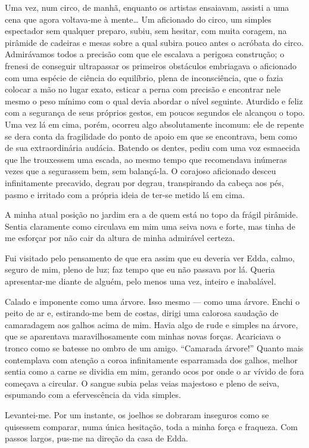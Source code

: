 Uma vez, num circo, de manhã, enquanto os artistas ensaiavam, assisti a uma cena que agora voltava-me à mente\ldots{} Um aficionado do circo, um simples espectador sem qualquer preparo, subiu, sem hesitar, com muita coragem, na pirâmide de cadeiras e mesas sobre a qual subira pouco antes o acróbata do circo. Admirávamos todos a precisão com que ele escalava a perigosa construção; o frenesi de conseguir ultrapassar os primeiros obstáculos embriagava o aficionado com uma espécie de ciência do equilíbrio, plena de inconsciência, que o fazia colocar a mão no lugar exato, esticar a perna com precisão e encontrar nele mesmo o peso mínimo com o qual devia abordar o nível seguinte. Aturdido e feliz com a segurança de seus próprios gestos, em poucos segundos ele alcançou o topo. Uma vez lá em cima, porém, ocorreu algo absolutamente incomum: ele de repente se dera conta da fragilidade do ponto de apoio em que se encontrava, bem como de sua extraordinária audácia. Batendo os dentes, pediu com uma voz esmaecida que lhe trouxessem uma escada, ao mesmo tempo que recomendava inúmeras vezes que a segurassem bem, sem balançá-la. O corajoso aficionado desceu infinitamente precavido, degrau por degrau, transpirando da cabeça aos pés, pasmo e irritado com a própria ideia de ter-se metido lá em cima.

A minha atual posição no jardim era a de quem está no topo da frágil pirâmide. Sentia claramente como circulava em mim uma seiva nova e forte, mas tinha de me esforçar por não cair da altura de minha admirável certeza.

Fui visitado pelo pensamento de que era assim que eu deveria ver Edda, calmo, seguro de mim, pleno de luz; faz tempo que eu não passava por lá. Queria apresentar-me diante de alguém, pelo menos uma vez, inteiro e inabalável.

Calado e imponente como uma árvore. Isso mesmo --- como uma árvore. Enchi o peito de ar e, estirando-me bem de costas, dirigi uma calorosa saudação de camaradagem aos galhos acima de mim. Havia algo de rude e simples na árvore, que se aparentava maravilhosamente com minhas novas forças. Acariciava o tronco como se batesse no ombro de um amigo. ``Camarada árvore!'' Quanto mais contemplava com atenção a coroa infinitamente esparramada dos galhos, melhor sentia como a carne se dividia em mim, gerando ocos por onde o ar vívido de fora começava a circular. O sangue subia pelas veias majestoso e pleno de seiva, espumando com a efervescência da vida simples.

Levantei-me. Por um instante, os joelhos se dobraram inseguros como se quisessem comparar, numa única hesitação, toda a minha força e fraqueza. Com passos largos, pus-me na direção da casa de Edda.

